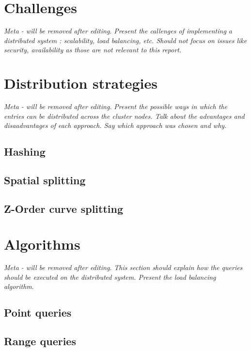 \documentclass[11pt,a4paper]{globis-book}
\begin{document}
\section{Challenges}
\label{sec:distindex-challenges}

\textit{Meta - will be removed after editing.}
\textit{Present the callenges of implementing a distributed system : scalability, load balancing, etc. Should not focus on issues like security, availability as those are not relevant to this report.}

\section{Distribution strategies}
\label{sec:distindex-strategies}

\textit{Meta - will be removed after editing.}
\textit{Present the possible ways in which the entries can be distributed across the cluster nodes. Talk about the advantages and disaadvantages of each approach. Say which approach was chosen and why.}

\subsection{Hashing}

\subsection{Spatial splitting}

\subsection{Z-Order curve splitting}

\section{Algorithms}
\label{sec:distindex-algorithms}

\textit{Meta - will be removed after editing.}
\textit{This section should explain how the queries should be executed on the distributed system. Present the load balancing algorithm}.

\subsection{Point queries}

\subsection{Range queries}
\end{document}
